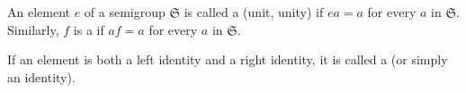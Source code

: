 An element $e$ of a semigroup $\mathfrak{S}$ is called a  (unit, unity) if $ea = a$ for every $a$ in $\mathfrak{S}$. Similarly, $f$ is a  if $af = a$ for every $a$ in $\mathfrak{S}$.

If an element is both a left identity and a right identity, it is called a  (or simply an identity).
